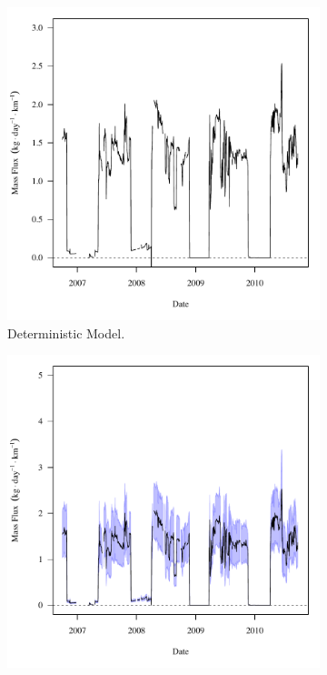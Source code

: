 \begin{linenumbers}
\begin{landscape}
\begin{figure}
\begin{subfigure}{0.7\textwidth}
			\includegraphics[width=\tableCustomSize]{"Figures/Results_DSR/Deterministic/f BUF"}
			\caption{Deterministic Model.}
		\end{subfigure}%
		\begin{subfigure}{0.7\textwidth}
			\centering
			\includegraphics[width=\tableCustomSize]{"Figures/Results_DSR/Stochastic/f BUF"}

\end{subfigure}
\end{figure}
\end{landscape}
\end{linenumbers}
